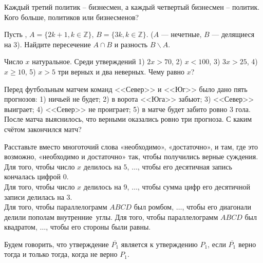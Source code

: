 \documentclass[a4paper,11pt]{article}
\renewcommand{\Z}{\mathbb Z}
\renewcommand{\ge}{\geqslant}
\newcommand{\regionB}[1]
{   \fill[#1] (30:2) arc (60:0:{2*sqrt(3)}) arc (-60:120:{2*sqrt(3)}) arc (60:0:{2*sqrt(3)});
}
\newcommand{\regionA}[1]
{   \fill[#1] (150:2) arc (180:120:{2*sqrt(3)}) arc (60:240:{2*sqrt(3)}) arc (180:120:{2*sqrt(3)});
}
\newcommand{\regionC}[1]
{   \fill[#1] (270:2) arc (240:300:{2*sqrt(3)}) arc (360:180:{2*sqrt(3)}) arc (240:300:{2*sqrt(3)});
}
\newcommand{\regionAB}[1]
{   \fill[#1] (30:2) arc (0:60:{2*sqrt(3)}) arc (120:180:{2*sqrt(3)}) arc (120:60:{2*sqrt(3)});
}
\newcommand{\regionBC}[1]
{   \fill[#1] (30:2) arc (60:0:{2*sqrt(3)}) arc (300:240:{2*sqrt(3)}) arc (-60:0:{2*sqrt(3)});
}
\newcommand{\regionAC}[1]
{   \fill[#1] (150:2) arc (120:180:{2*sqrt(3)}) arc (240:300:{2*sqrt(3)}) arc (240:180:{2*sqrt(3)});
}
\newcommand{\regionABC}[1]
{   \fill[#1] (30:2) arc (60:120:{2*sqrt(3)}) arc (180:240:{2*sqrt(3)}) arc (-60:0:{2*sqrt(3)});
}
\newcommand{\mycolor}{blue!50!cyan}
\newcommand{\mynocolor}{white}
\begin{document}
\begin{tikzpicture}[scale=0.17]
 \end{tikzpicture} \quad {}

 Каждый третий политик – бизнесмен, а каждый
четвертый бизнесмен – политик. Кого больше, политиков или
бизнесменов?

 Пусть , $A=\{2k+1,k\in \Z\}$, $B=\{3k,k\in \Z\}$.
($A$ --- нечетные, $B$ --- делящиеся на 3). Найдите пересечение $A\cap B$ и
разность $B\backslash A$.

 Число $x$ натуральное. Среди утверждений 1) $2x>70$,
2) $x<100$, 3) $3x>25$, 4) $x \ge 10$, 5) $x>5$ три
верных и два неверных. Чему равно $x$?

 Перед футбольным матчем команд  <<Север>>  и <<Юг>> было дано пять прогнозов:
1) ничьей не будет; 2) в ворота <<Юга>> забьют; 3) <<Север>> выиграет; 4) <<Север>> не проиграет; 5) в матче будет забито ровно $3$ гола. После матча выяснилось, что верными оказались ровно три прогноза. С каким счётом закончился матч?

 Расставьте вместо многоточий слова «необходимо», «достаточно», и там, где это возможно, «необходимо и достаточно» так, чтобы получились верные суждения.\\
 Для того, чтобы число $x$ делилось на $5$, $\ldots$, чтобы его десятичная запись кончалась цифрой $0$.\\
 Для того, чтобы число $x$ делилось на $9$, $\ldots$, чтобы сумма цифр его десятичной записи делилась на $3$.\\
 Для того, чтобы параллелограмм $ABCD$ был ромбом, $\ldots$, чтобы его диагонали делили пополам внутренние~углы.
 Для того, чтобы параллелограмм $ABCD$ был квадратом, $\ldots$, чтобы его стороны были равны.


 Будем говорить, что утверждение $\overline{P_1}$ является  к утверждению $P_1$, если $\overline{P_1}$ верно тогда и только тогда, когда не верно $P_1$.
\end{document}
